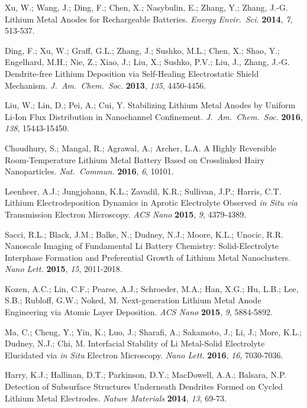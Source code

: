 \documentclass[prb,preprint,amsmath,amssymb]{revtex4}
\begin{document}
\begin{references}

Xu, W.; Wang, J.; Ding, F.; Chen, X.; Nasybulin, E.; Zhang, Y.; Zhang, J.-G.
Lithium Metal Anodes for Rechargeable Batteries.
{\it Energy Envir.~Sci.} {\bf 2014}, {\it 7}, 513-537.

Ding, F.; Xu, W.; Graff, G.L.; Zhang, J.; Sushko, M.L.; Chen, X.; Shao, Y.;
Engelhard, M.H.; Nie, Z.; Xiao, J.; Liu, X.; Sushko, P.V.; Liu, J., 
Zhang, J.-G.  Dendrite-free Lithium Deposition via Self-Healing Electrostatic
Shield Mechanism.  {\it J.~Am.~Chem.~Soc.} {\bf 2013}, {\it 135}, 4450-4456.

Liu, W.; Lin, D.; Pei, A.; Cui, Y.
Stabilizing Lithium Metal Anodes by Uniform Li-Ion Flux Distribution
in Nanochannel Confinement.
{\it J.~Am.~Chem.~Soc.} {\bf 2016}, {\it 138}, 15443-15450.

Choudhury, S.; Mangal, R.; Agrawal, A.; Archer, L.A.
A Highly Reversible Room-Temperature Lithium Metal Battery Based on
Crosslinked Hairy Nanoparticles.
{\it Nat.~Commun.} {\bf 2016}, {\it 6}, 10101.

Leenheer, A.J.; Jungjohann, K.L.; Zavadil, K.R.; Sullivan, J.P.; Harris,
C.T.  Lithium Electrodeposition Dynamics in Aprotic Electrolyte Observed
{\it in Situ via} Transmission Electron Microscopy.
{\it ACS Nano} {\bf 2015}, {\it 9}, 4379-4389.

Sacci, R.L.; Black, J.M.; Balke, N.; Dudney, N.J.; Moore, K.L.; Unocic, R.R.  
Nanoscale Imaging of Fundamental Li Battery Chemistry: Solid-Electrolyte
Interphase Formation and Preferential Growth of Lithium Metal Nanoclusters.
{\it Nano Lett.} {\bf 2015}, {\it 15}, 2011-2018.

Kozen, A.C.; Lin, C.F.; Pearse, A.J.; Schroeder, M.A.; Han, X.G.; 
Hu, L.B.; Lee, S.B.; Rubloff, G.W.; Noked, M. 
Next-generation Lithium Metal Anode Engineering via Atomic Layer Deposition.
{\it ACS Nano} {\bf 2015}, {\it 9}, 5884-5892.

Ma, C.; Cheng, Y.; Yin, K.; Luo, J.; Sharafi, A.; Sakamoto, J.; Li, J.; 
More, K.L.; Dudney, N.J.; Chi, M.  
Interfacial Stability of Li Metal-Solid Electrolyte Elucidated via {\it in Situ}
Electron Microscopy.  {\it Nano Lett.} {\bf 2016}, {\it 16}, 7030-7036.

Harry, K.J.; Hallinan, D.T.; Parkinson, D.Y.; MacDowell, A.A.; Balsara, N.P.
Detection of Subsurface Structures Underneath Dendrites Formed on Cycled
Lithium Metal Electrodes.  {\it Nature Materials} {\bf 2014}, {\it 13}, 69-73.


\end{references}
\end{document}
